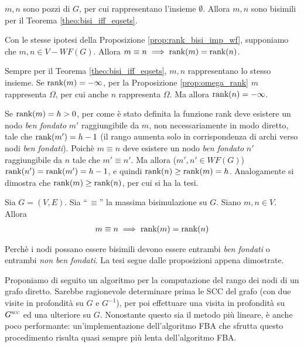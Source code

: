 \begin{proof2}
    $m,n$ sono pozzi di $G$, per cui rappresentano l'insieme $\emptyset$. Allora $m,n$ sono bisimili per il Teorema \ref{theo:bisi_iff_eqsets}.
\end{proof2}
\begin{proposition}
    Con le stesse ipotesi della Proposizione \ref{prop:rank_bisi_imp_wf}, supponiamo che $m,n \in V - WF(G)$. Allora $m \equiv n \implies \textup{rank}(m) = \textup{rank}(n)$.
\end{proposition}
\begin{proof2}
    Sempre per il Teorema \ref{theo:bisi_iff_eqsets}, $m,n$ rappresentano lo stesso insieme. Se $\textup{rank}(m) = -\infty$, per la Proposizione \ref{prop:omega_rank} $m$ rappresenta $\Omega$, per cui anche $n$ rappresenta $\Omega$. Ma allora $\textup{rank}(n) = -\infty$.

    Se $\textup{rank}(m) = h > 0$, per come è stato definita la funzione rank deve esistere un nodo \emph{ben fondato} $m'$ raggiungibile da $m$, non necessariamente in modo diretto, tale che $\textup{rank}(m') = h-1$ (il rango aumenta solo in corrispondenza di archi verso nodi \emph{ben fondati}). Poichè $m \equiv n$ deve esistere un nodo \emph{ben fondato} $n'$ raggiungibile da $n$ tale che $m' \equiv n'$. Ma allora ($m',n' \in WF(G)$) $\textup{rank}(n') = \textup{rank}(m') = h-1$, e quindi $\textup{rank}(n) \geq \textup{rank}(m) = h$. Analogamente si dimostra che $\textup{rank}(m) \geq \textup{rank}(n)$, per cui si ha la tesi.
\end{proof2}
\begin{theorem}
    \label{theo:bisi_rank}
    Sia $G = (V,E)$. Sia ``\,$\equiv$'' la massima bisimulazione su $G$. Siano $m,n \in V$. Allora
    \begin{gather*}
        m \equiv n \implies \textup{rank}(m) = \textup{rank}(n)
    \end{gather*}
\end{theorem}
\begin{proof2}
    Perchè i nodi possano essere bisimili devono essere entrambi \emph{ben fondati} o entrambi \emph{non ben fondati}. La tesi segue dalle proposizioni appena dimostrate.
\end{proof2}

Proponiamo di seguito un algoritmo per la computazione del rango dei nodi di un grafo diretto. Sarebbe ragionevole determinare prima le SCC del grafo (con due visite in profondità su $G$ e $G^{-1}$), per poi effettuare una visita in profondità su $G^{\superscc}$ ed una ulteriore su $G$. Nonostante questo sia il metodo più lineare, è anche poco performante: un'implementazione dell'algoritmo FBA che sfrutta questo procedimento risulta quasi sempre più lenta dell'algoritmo FBA.

